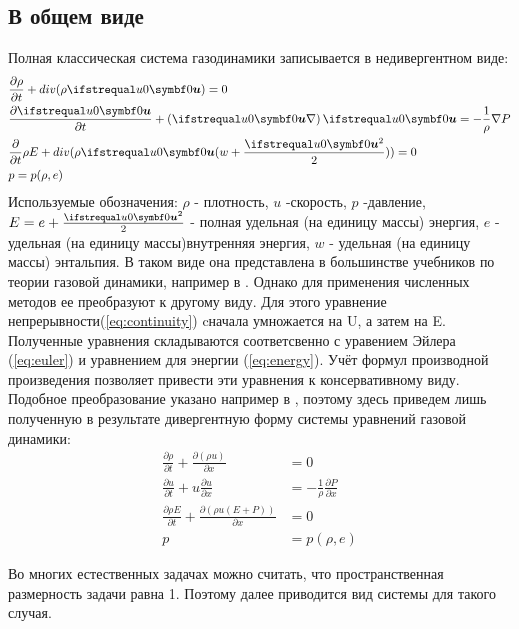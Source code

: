 \documentclass[a4paper,12pt]{extarticle}
\begin{document}
\subsection{В общем виде}
    Полная классическая система газодинамики записывается в недивергентном виде:
    \begin{align} 
        &\frac{\partial \rho}{\partial t} + div(\rho \vecxu) = 0 \label{eq:continuity}\\
        &\frac{\partial \vecxu}{\partial t} + \left(\vecxu \nabla \right)\vecxu = -\frac{1}{\rho}\nabla P  \label{eq:euler}	\\
        &\frac{\partial }{\partial t}\rho E + div(\rho \vecxu (w+\frac{\vecxu^2}{2})) = 0  \label{eq:energy} \\
        &p = p(\rho,e)
    \end{align}
    Используемые обозначения: $\rho$ - плотность, $u$ -скорость, $p$ -давление, $E = e + \frac{\vecxu^2}{2}$ - полная удельная (на единицу массы) энергия, $e$ - удельная (на единицу массы)внутренняя энергия, $w$ - удельная (на единицу массы) энтальпия.
    В таком виде она представлена в большинстве учебников по теории газовой динамики, например в \cite{godunov1976}. 
    Однако для применения численных методов ее преобразуют к другому виду. Для этого уравнение непрерывности(\ref{eq:continuity}) cначала умножается на U, а затем на E. Полученные уравнения складываются соответсвенно с уравением Эйлера (\ref{eq:euler}) и уравнением для энергии (\ref{eq:energy}). Учёт формул производной произведения позволяет привести эти уравнения к консервативному виду. Подобное преобразование указано например в \cite{MolchanovGasdynamics2013}, поэтому здесь приведем лишь полученную в результате дивергентную форму системы уравнений газовой динамики: 
    \begin{align}
        \frac{\partial \rho}{\partial t} + \frac{\partial (\rho u)}{\partial x} &= 0 \\
        \frac{\partial u}{\partial t} + u \frac{\partial u}{\partial x} &= - \frac{1}{\rho} \frac{\partial P}{\partial x} \\
        \frac{\partial \rho E}{\partial t} + \frac{\partial (\rho u(E + P))}{\partial x} &= 0 \\
        p &= p(\rho, e)
    \end{align}
    
    Во многих естественных задачах можно считать, что пространственная размерность задачи равна 1. Поэтому далее приводится вид системы для такого случая. 
\end{document}
